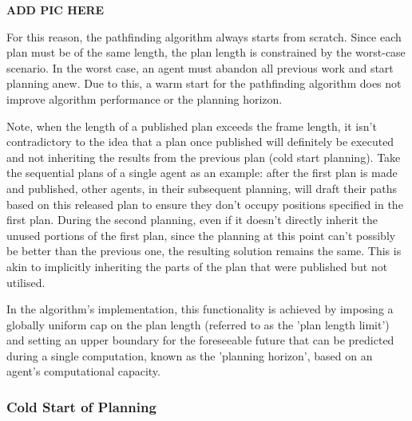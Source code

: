 {\textbf{ADD PIC HERE} %

For this reason, the pathfinding algorithm always starts from scratch. Since each plan must be of the same length, the plan length is constrained by the worst-case scenario. In the worst case, an agent must abandon all previous work and start planning anew. Due to this, a warm start for the pathfinding algorithm does not improve algorithm performance or the planning horizon.

Note, when the length of a published plan exceeds the frame length, it isn't contradictory to the idea that a plan once published will definitely be executed and not inheriting the results from the previous plan (cold start planning). Take the sequential plans of a single agent as an example: after the first plan is made and published, other agents, in their subsequent planning, will draft their paths based on this released plan to ensure they don't occupy positions specified in the first plan. During the second planning, even if it doesn't directly inherit the unused portions of the first plan, since the planning at this point can't possibly be better than the previous one, the resulting solution remains the same. This is akin to implicitly inheriting the parts of the plan that were published but not utilised.

In the algorithm's implementation, this functionality is achieved by imposing a globally uniform cap on the plan length (referred to as the 'plan length limit') and setting an upper boundary for the foreseeable future that can be predicted during a single computation, known as the 'planning horizon', based on an agent's computational capacity.
}

\subsubsection{Cold Start of Planning}

